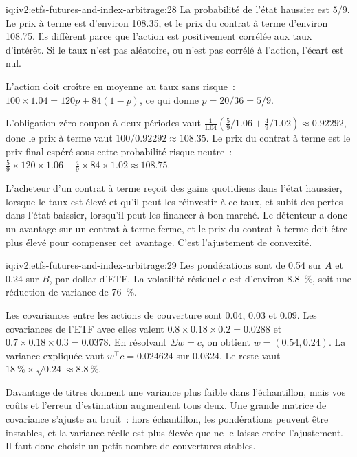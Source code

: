 \begin{solution}{iq:iv2:etfs-futures-and-index-arbitrage:28}
La probabilité de l'état haussier est $5/9$. Le prix à terme est d'environ 108.35, et le prix du contrat à terme d'environ 108.75. Ils diffèrent parce que l'action est positivement corrélée aux taux d'intérêt. Si le taux n'est pas aléatoire, ou n'est pas corrélé à l'action, l'écart est nul.

L'action doit croître en moyenne au taux sans risque~: $100 \times 1.04 = 120p + 84(1 - p)$, ce qui donne $p = 20/36 = 5/9$.

L'obligation zéro-coupon à deux périodes vaut $\tfrac{1}{1.04}\left(\tfrac59/1.06 + \tfrac49/1.02\right) \approx 0.92292$, donc le prix à terme vaut $100/0.92292 \approx 108.35$. Le prix du contrat à terme est le prix final espéré sous cette probabilité risque-neutre~: $\tfrac59 \times 120 \times 1.06 + \tfrac49 \times 84 \times 1.02 \approx 108.75$.

L'acheteur d'un contrat à terme reçoit des gains quotidiens dans l'état haussier, lorsque le taux est élevé et qu'il peut les réinvestir à ce taux, et subit des pertes dans l'état baissier, lorsqu'il peut les financer à bon marché. Le détenteur a donc un avantage sur un contrat à terme ferme, et le prix du contrat à terme doit être plus élevé pour compenser cet avantage. C'est l'ajustement de convexité.

\end{solution}

\begin{solution}{iq:iv2:etfs-futures-and-index-arbitrage:29}
Les pondérations sont de 0.54 sur $A$ et 0.24 sur $B$, par dollar d'ETF. La volatilité résiduelle est d'environ 8.8~\%, soit une réduction de variance de 76~\%.

Les covariances entre les actions de couverture sont $0.04$, $0.03$ et $0.09$. Les covariances de l'ETF avec elles valent $0.8 \times 0.18 \times 0.2 = 0.0288$ et $0.7 \times 0.18 \times 0.3 = 0.0378$. En résolvant $\Sigma w = c$, on obtient $w = (0.54, 0.24)$. La variance expliquée vaut $w^\top c = 0.024624$ sur $0.0324$. Le reste vaut $18~\% \times \sqrt{0.24} \approx 8.8~\%$.

Davantage de titres donnent une variance plus faible dans l'échantillon, mais vos coûts et l'erreur d'estimation augmentent tous deux. Une grande matrice de covariance s'ajuste au bruit~: hors échantillon, les pondérations peuvent être instables, et la variance réelle est plus élevée que ne le laisse croire l'ajustement. Il faut donc choisir un petit nombre de couvertures stables.

\end{solution}

